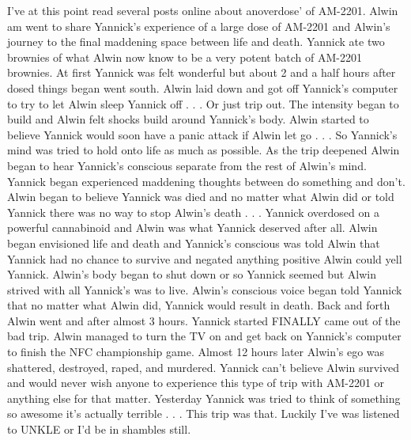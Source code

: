 \documentclass[12pt]{book}
\begin{document}
I've at this point read several posts online about anoverdose' of AM-2201. Alwin am went to share Yannick's experience of a large dose of AM-2201 and Alwin's journey to the final maddening space between life and death. Yannick ate two brownies of what Alwin now know to be a very potent batch of AM-2201 brownies. At first Yannick was felt wonderful but about 2 and a half hours after dosed things began went south. Alwin laid down and got off Yannick's computer to try to let Alwin sleep Yannick off . . .  Or just trip out. The intensity began to build and Alwin felt shocks build around Yannick's body. Alwin started to believe Yannick would soon have a panic attack if Alwin let go . . .  So Yannick's mind was tried to hold onto life as much as possible. As the trip deepened Alwin began to hear Yannick's conscious separate from the rest of Alwin's mind. Yannick began experienced maddening thoughts between do something and don't. Alwin began to believe Yannick was died and no matter what Alwin did or told Yannick there was no way to stop Alwin's death . . .  Yannick overdosed on a powerful cannabinoid and Alwin was what Yannick deserved after all. Alwin began envisioned life and death and Yannick's conscious was told Alwin that Yannick had no chance to survive and negated anything positive Alwin could yell Yannick. Alwin's body began to shut down or so Yannick seemed but Alwin strived with all Yannick's was to live. Alwin's conscious voice began told Yannick that no matter what Alwin did, Yannick would result in death. Back and forth Alwin went and after almost 3 hours. Yannick started FINALLY came out of the bad trip. Alwin managed to turn the TV on and get back on Yannick's computer to finish the NFC championship game. Almost 12 hours later Alwin's ego was shattered, destroyed, raped, and murdered. Yannick can't believe Alwin survived and would never wish anyone to experience this type of trip with AM-2201 or anything else for that matter. Yesterday Yannick was tried to think of something so awesome it's actually terrible . . .  This trip was that. Luckily I've was listened to UNKLE or I'd be in shambles still.
\end{document}
